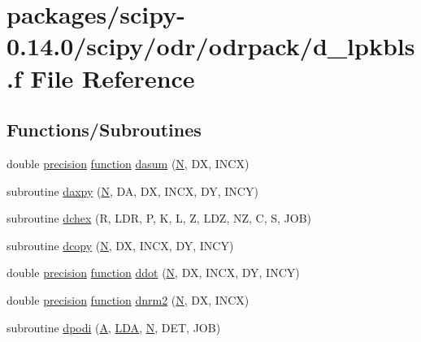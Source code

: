 \hypertarget{d__lpkbls_8f}{}\section{packages/scipy-\/0.14.0/scipy/odr/odrpack/d\+\_\+lpkbls.f File Reference}
\label{d__lpkbls_8f}
\subsection*{Functions/\+Subroutines}
\begin{DoxyCompactItemize}
\item 
double \hyperlink{numinquire_8h_a2c8e616467665d0b2814d4c1589ba74e}{precision} \hyperlink{afunc_8m_a7b5e596df91eadea6c537c0825e894a7}{function} \hyperlink{d__lpkbls_8f_a7372361a44de0649813750b3280c58cc}{dasum} (\hyperlink{polmisc_8c_a0240ac851181b84ac374872dc5434ee4}{N}, D\+X, I\+N\+C\+X)
\item 
subroutine \hyperlink{d__lpkbls_8f_a8f99d6a644d3396aa32db472e0cfc91c}{daxpy} (\hyperlink{polmisc_8c_a0240ac851181b84ac374872dc5434ee4}{N}, D\+A, D\+X, I\+N\+C\+X, D\+Y, I\+N\+C\+Y)
\item 
subroutine \hyperlink{d__lpkbls_8f_a7a6e09b2d458510bb00fd110e13d8edf}{dchex} (R, L\+D\+R, P, K, L, Z, L\+D\+Z, N\+Z, C, S, J\+O\+B)
\item 
subroutine \hyperlink{d__lpkbls_8f_a21cdaae1732dea58194c279fca30126d}{dcopy} (\hyperlink{polmisc_8c_a0240ac851181b84ac374872dc5434ee4}{N}, D\+X, I\+N\+C\+X, D\+Y, I\+N\+C\+Y)
\item 
double \hyperlink{numinquire_8h_a2c8e616467665d0b2814d4c1589ba74e}{precision} \hyperlink{afunc_8m_a7b5e596df91eadea6c537c0825e894a7}{function} \hyperlink{d__lpkbls_8f_a75066c4825cb6ff1c8ec4403ef8c843a}{ddot} (\hyperlink{polmisc_8c_a0240ac851181b84ac374872dc5434ee4}{N}, D\+X, I\+N\+C\+X, D\+Y, I\+N\+C\+Y)
\item 
double \hyperlink{numinquire_8h_a2c8e616467665d0b2814d4c1589ba74e}{precision} \hyperlink{afunc_8m_a7b5e596df91eadea6c537c0825e894a7}{function} \hyperlink{d__lpkbls_8f_ab22f23f56a7d387f6b84c8a206adc353}{dnrm2} (\hyperlink{polmisc_8c_a0240ac851181b84ac374872dc5434ee4}{N}, D\+X, I\+N\+C\+X)
\item 
subroutine \hyperlink{d__lpkbls_8f_af9bde662e18ccd81fc8ac8c9e6a3b395}{dpodi} (\hyperlink{classA}{A}, \hyperlink{example__user_8c_ae946da542ce0db94dced19b2ecefd1aa}{L\+D\+A}, \hyperlink{polmisc_8c_a0240ac851181b84ac374872dc5434ee4}{N}, D\+E\+T, J\+O\+B)

\end{DoxyCompactItemize}
